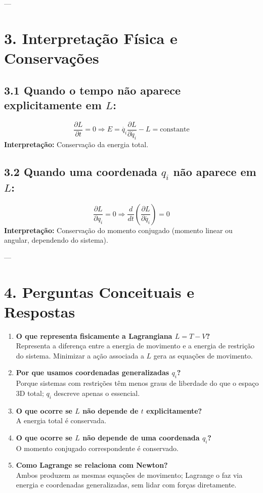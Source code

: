 \documentclass[a4paper,12pt]{article}
\begin{document}
---

\section*{3. Interpretação Física e Conservações}

\subsection*{3.1 Quando o tempo não aparece explicitamente em $L$:}
\[
\frac{\partial L}{\partial t} = 0 \Rightarrow E = \dot{q_i}\frac{\partial L}{\partial \dot{q_i}} - L = \text{constante}
\]
\textbf{Interpretação:} Conservação da energia total.

\subsection*{3.2 Quando uma coordenada $q_i$ não aparece em $L$:}
\[
\frac{\partial L}{\partial q_i} = 0 \Rightarrow \frac{d}{dt}\left( \frac{\partial L}{\partial \dot{q_i}} \right) = 0
\]
\textbf{Interpretação:} Conservação do momento conjugado (momento linear ou angular, dependendo do sistema).

---

\section*{4. Perguntas Conceituais e Respostas}

\begin{enumerate}
    \item \textbf{O que representa fisicamente a Lagrangiana $L = T - V$?}\\
    Representa a diferença entre a energia de movimento e a energia de restrição do sistema. Minimizar a ação associada a $L$ gera as equações de movimento.

    \item \textbf{Por que usamos coordenadas generalizadas $q_i$?}\\
    Porque sistemas com restrições têm menos graus de liberdade do que o espaço 3D total; $q_i$ descreve apenas o essencial.

    \item \textbf{O que ocorre se $L$ não depende de $t$ explicitamente?}\\
    A energia total é conservada.

    \item \textbf{O que ocorre se $L$ não depende de uma coordenada $q_i$?}\\
    O momento conjugado correspondente é conservado.

    \item \textbf{Como Lagrange se relaciona com Newton?}\\
    Ambos produzem as mesmas equações de movimento; Lagrange o faz via energia e coordenadas generalizadas, sem lidar com forças diretamente.
\end{enumerate}
\end{document}
